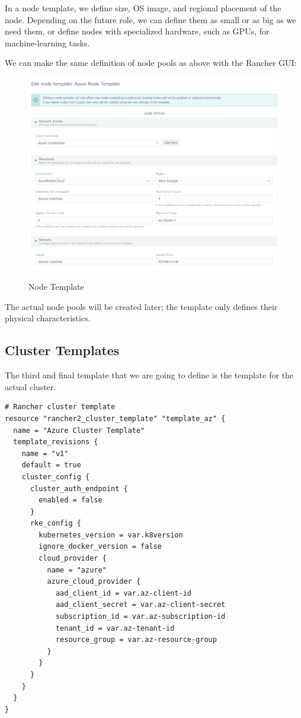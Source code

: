 In a node template, we define size, OS image, and regional placement of the node. Depending on the future role, we can define them as small or as big as we need them, or define nodes with specialized hardware, such as GPUs, for machine-learning tasks.

We can make the same definition of node pools as above with the Rancher GUI:

\begin{figure}[H]
\centering
\caption {Node Template}
\includegraphics[width=\linewidth]{images/node-template.png}
\label{fig:nodeTemplate}
\end{figure}

The actual node pools will be created later; the template only defines their physical characteristics.

\subsection{Cluster Templates}

The third and final template that we are going to define is the template for the actual cluster.

\begin{lstlisting}[caption=Cluster Template, frame=single, basicstyle=\ttfamily]
# Rancher cluster template 
resource "rancher2_cluster_template" "template_az" {
  name = "Azure Cluster Template"
  template_revisions {
    name = "v1"
    default = true
    cluster_config {
      cluster_auth_endpoint {
        enabled = false
      }
      rke_config {
        kubernetes_version = var.k8version
        ignore_docker_version = false
        cloud_provider {
          name = "azure"
          azure_cloud_provider {
            aad_client_id = var.az-client-id
            aad_client_secret = var.az-client-secret
            subscription_id = var.az-subscription-id
            tenant_id = var.az-tenant-id
            resource_group = var.az-resource-group
          }
        }
      }
    }
  }
}
\end{lstlisting}

